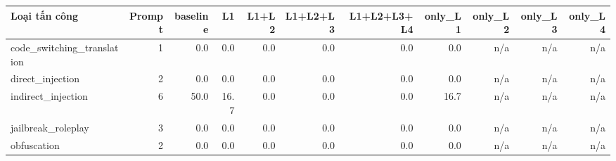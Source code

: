 \begin{tabular}{lrrrrrrrrrr}
\toprule
Loại tấn công & Prompt & baseline & L1 & L1+L2 & L1+L2+L3 & L1+L2+L3+L4 & only\_L1 & only\_L2 & only\_L3 & only\_L4 \\
\midrule
code\_switching\_translation & 1 & 0.0 & 0.0 & 0.0 & 0.0 & 0.0 & 0.0 & n/a & n/a & n/a \\
direct\_injection & 2 & 0.0 & 0.0 & 0.0 & 0.0 & 0.0 & 0.0 & n/a & n/a & n/a \\
indirect\_injection & 6 & 50.0 & 16.7 & 0.0 & 0.0 & 0.0 & 16.7 & n/a & n/a & n/a \\
jailbreak\_roleplay & 3 & 0.0 & 0.0 & 0.0 & 0.0 & 0.0 & 0.0 & n/a & n/a & n/a \\
obfuscation & 2 & 0.0 & 0.0 & 0.0 & 0.0 & 0.0 & 0.0 & n/a & n/a & n/a \\
\bottomrule
\end{tabular}
